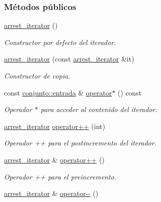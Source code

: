 \subsubsection*{Métodos públicos}
\begin{DoxyCompactItemize}
\item 
\hyperlink{classconjunto_1_1arrest__iterator_a171656c640d0f3e8ba8db67eb00acef5}{arrest\-\_\-iterator} ()
\begin{DoxyCompactList}\small\item\em Constructor por defecto del iterador. \end{DoxyCompactList}\item 
\hyperlink{classconjunto_1_1arrest__iterator_ad38cb7a345d56aebbd01f7e9dbe07d2b}{arrest\-\_\-iterator} (const \hyperlink{classconjunto_1_1arrest__iterator}{arrest\-\_\-iterator} \&it)
\begin{DoxyCompactList}\small\item\em Constructor de copia. \end{DoxyCompactList}\item 
const \hyperlink{classconjunto_a09cad766dd65de73e51eae21f9d22585}{conjunto\-::entrada} \& \hyperlink{classconjunto_1_1arrest__iterator_ac1a96e28b643da75f3e84ffd54a8867e}{operator$\ast$} () const 
\begin{DoxyCompactList}\small\item\em Operador $\ast$ para acceder al contenido del iterador. \end{DoxyCompactList}\item 
\hyperlink{classconjunto_1_1arrest__iterator}{arrest\-\_\-iterator} \hyperlink{classconjunto_1_1arrest__iterator_a9f350bb37bcac3754df9c13d856ee56c}{operator++} (int)
\begin{DoxyCompactList}\small\item\em Operador ++ para el postincremento del iterador. \end{DoxyCompactList}\item 
\hyperlink{classconjunto_1_1arrest__iterator}{arrest\-\_\-iterator} \& \hyperlink{classconjunto_1_1arrest__iterator_a5e26688efae4b7b9edd54a83dc0f961e}{operator++} ()
\begin{DoxyCompactList}\small\item\em Operador ++ para el preincremento. \end{DoxyCompactList}\item 
\hyperlink{classconjunto_1_1arrest__iterator}{arrest\-\_\-iterator} \& \hyperlink{classconjunto_1_1arrest__iterator_a6d2cd27f29cd3bd7ac71057ce5621f17}{operator-\/-\/} ()

\end{DoxyCompactItemize}
